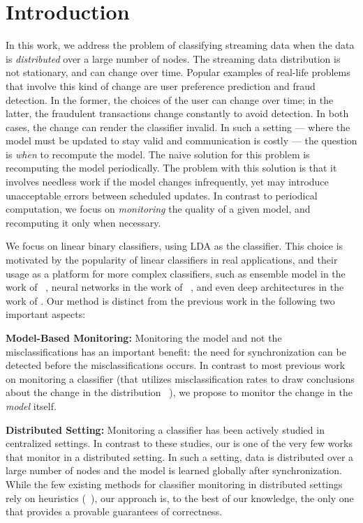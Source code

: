 \section{Introduction}

In this work, we address the problem of classifying streaming data when the data 
is \textit{distributed} over a large number of nodes. The streaming data distribution is not stationary, and can change over time. Popular examples of real-life problems that involve this kind of change are user preference prediction and fraud detection. In the former, the choices of the user can change over time; in the latter, the fraudulent transactions change constantly to avoid detection. In both cases, the change can render the classifier invalid.
In such a setting --- where the model must be updated to stay valid and communication is costly --- the question is \textit{when} to recompute the model. The naive solution for this problem is recomputing the model periodically. The problem with this solution is that it involves needless work if the model changes infrequently, yet may introduce unacceptable errors between scheduled updates. 
In contrast to periodical computation, we focus on \textit{monitoring} the quality of a given model, and recomputing it only when necessary. 
\par We focus on linear binary classifiers, using LDA \cite{fisher1936use} as the classifier. This choice is motivated by the popularity of linear classifiers in real applications, and their usage as a platform for more complex classifiers, such as ensemble model in the work of ~\cite{Deva, eSVM}, neural networks in the work of ~\cite{osadchy2015k}, 
and even deep architectures in the work of \cite{ROSS}. Our method is distinct from the previous work in the following two important aspects:

\noindent \textbf{Model-Based Monitoring:} 
Monitoring the model and not the misclassifications has an important benefit: the need for synchronization can be detected before the misclassifications occurs. In contrast to most previous work on monitoring a classifier (that utilizes misclassification rates to draw conclusions about the change in the distribution ~\cite{baena2006early, gama2004learning, nishida2007detecting}), we propose to monitor the change in the \textit{model} itself.

\noindent \textbf{Distributed Setting:} Monitoring a classifier has been actively studied in centralized settings. In contrast to these studies, our is one of the very few works that monitor in a distributed setting. In such a setting, data is distributed over a large number of nodes and the model is learned globally after synchronization. While the few existing methods for classifier monitoring in distributed settings rely on heuristics (~\cite{AngGZPH13}), our approach is, to the best of our knowledge, the only one that provides a provable guarantees of correctness.

